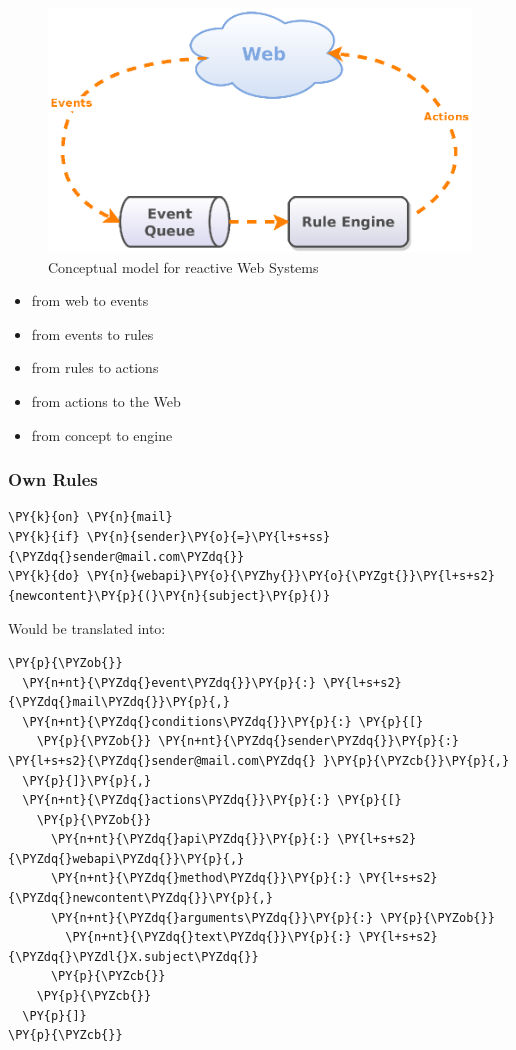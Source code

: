 \begin{figure}[!ht]
  \centering
  \includegraphics{figures/Conceptual_Model}
  \caption{Conceptual model for reactive Web Systems}
  \label{fig:Conceptual_Model}
\end{figure}


\begin{itemize}
  \item from web to events
  \item from events to rules
  \item from rules to actions
  \item from actions to the Web
  \item from concept to engine
\end{itemize}




\newpage
\subsubsection{Own Rules}
\begin{Verbatim}[fontsize=\small,commandchars=\\\{\}]
\PY{k}{on} \PY{n}{mail}
\PY{k}{if} \PY{n}{sender}\PY{o}{=}\PY{l+s+ss}{\PYZdq{}sender@mail.com\PYZdq{}}
\PY{k}{do} \PY{n}{webapi}\PY{o}{\PYZhy{}}\PY{o}{\PYZgt{}}\PY{l+s+s2}{newcontent}\PY{p}{(}\PY{n}{subject}\PY{p}{)}
\end{Verbatim}

Would be translated into:

\begin{Verbatim}[fontsize=\small,commandchars=\\\{\}]
\PY{p}{\PYZob{}}
  \PY{n+nt}{\PYZdq{}event\PYZdq{}}\PY{p}{:} \PY{l+s+s2}{\PYZdq{}mail\PYZdq{}}\PY{p}{,}
  \PY{n+nt}{\PYZdq{}conditions\PYZdq{}}\PY{p}{:} \PY{p}{[}
    \PY{p}{\PYZob{}} \PY{n+nt}{\PYZdq{}sender\PYZdq{}}\PY{p}{:} \PY{l+s+s2}{\PYZdq{}sender@mail.com\PYZdq{} }\PY{p}{\PYZcb{}}\PY{p}{,}
  \PY{p}{]}\PY{p}{,}
  \PY{n+nt}{\PYZdq{}actions\PYZdq{}}\PY{p}{:} \PY{p}{[}
    \PY{p}{\PYZob{}}
      \PY{n+nt}{\PYZdq{}api\PYZdq{}}\PY{p}{:} \PY{l+s+s2}{\PYZdq{}webapi\PYZdq{}}\PY{p}{,}
      \PY{n+nt}{\PYZdq{}method\PYZdq{}}\PY{p}{:} \PY{l+s+s2}{\PYZdq{}newcontent\PYZdq{}}\PY{p}{,}
      \PY{n+nt}{\PYZdq{}arguments\PYZdq{}}\PY{p}{:} \PY{p}{\PYZob{}}
        \PY{n+nt}{\PYZdq{}text\PYZdq{}}\PY{p}{:} \PY{l+s+s2}{\PYZdq{}\PYZdl{}X.subject\PYZdq{}}
      \PY{p}{\PYZcb{}}
    \PY{p}{\PYZcb{}}
  \PY{p}{]}
\PY{p}{\PYZcb{}}
\end{Verbatim}

